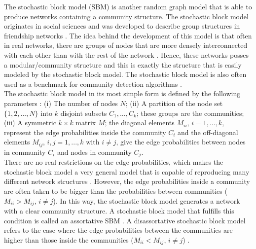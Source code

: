\documentclass[11 pt , letterpaper , twoside , openright]{book}
\begin{document}
The stochastic block model (SBM) is another random graph model that is able to produce networks containing a community structure. The stochastic block model originates in social sciences and was developed to describe group structures in friendship networks \cite{Funke2019}. The idea behind the development of this model is that often in real networks, there are groups of nodes that are more densely interconnected with each other than with the rest of the network \cite{F.Costa2007}. Hence, these networks posses a modular/community structure and this is exactly the structure that is easily modeled by the stochastic block model. The stochastic block model is also often used as a benchmark for community detection algorithms \cite{Abbe2018}.\\
\newline
The stochastic block model in its most simple form is defined by the following parameters \cite{Clauset2017}: (i) The number of nodes $N$; (ii) A partition of the node set $\{1, 2, ..., N\}$ into $k$ disjoint subsets $C_1, ..., C_k$; these groups are the communities; (iii) A symmetric $k\times k$ matrix $M$; the diagonal elements $M_{ii}$, $i = 1, ..., k$, represent the edge probabilities inside the community $C_i$ and the off-diagonal elements $M_{ij}$, $i, j = 1, ..., k$ with $i \neq j$, give the edge probabilities between nodes in community $C_i$ and nodes in community $C_j$.\\
\newline
There are no real restrictions on the edge probabilities, which makes the stochastic block model a very general model that is capable of reproducing many different network structures \cite{Karrer2011}. However, the edge probabilities inside a community are often taken to be bigger than the probabilities between communities ($M_{ii} > M_{ij}$, $i \neq j$). In this way, the stochastic block model generates a network with a clear community structure. A stochastic block model that fulfills this condition is called an assortative SBM \cite{Lee2019}. A disassortative stochastic block model refers to the case where the edge probabilities between the communities are higher than those inside the communities ($M_{ii} < M_{ij}$, $i \neq j$) \cite{Gribel2020}.\\
\newline
\end{document}
